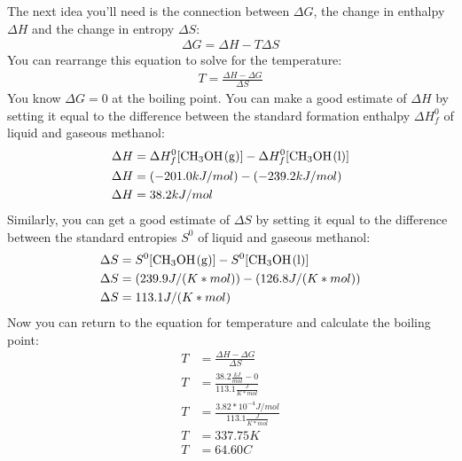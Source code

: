 \documentclass{article}  %
\begin{document}
The next idea you'll need is the connection between $\Delta G$, the change in enthalpy $\Delta H$ and the change in entropy $\Delta S$:
    \begin{equation*}
        \begin{aligned}
            \Delta G = \Delta H - T\Delta S 
        \end{aligned}
    \end{equation*}
You can rearrange this equation to solve for the temperature:
    \begin{equation*}
        \begin{aligned}
            T = \frac{\Delta H - \Delta G}{\Delta S}
        \end{aligned}
    \end{equation*}
You know $\Delta G = 0$ at the boiling point. You can make a good estimate of $\Delta H$ by setting it equal to the difference between the standard formation enthalpy $\Delta H^0_f$ of liquid and gaseous methanol:
\begin{equation*}
    \begin{aligned}
        \Delta H &= \Delta H^0_f [\ce{CH3OH_(g)}] - \Delta H^0_f[\ce{CH3OH_(l)}] \\
        \Delta H &= (-201.0 kJ/mol) - (-239.2 kJ/mol) \\
        \Delta H &= 38.2 kJ/mol
    \end{aligned}
\end{equation*}
Similarly, you can get a good estimate of $\Delta S$ by setting it equal to the difference between the standard entropies $S^0$ of liquid and gaseous methanol:
\begin{equation*}
    \begin{aligned}
        \Delta S &= S^0 [\ce{CH3OH_(g)}]-S^0[\ce{CH3OH_(l)}] \\
        \Delta S &= (239.9 J/(K*mol)) - (126.8 J/(K*mol)) \\
        \Delta S &= 113.1 J/(K*mol)
    \end{aligned}
\end{equation*}
Now you can return to the equation for temperature and calculate the boiling point: 
    \begin{equation*}
        \begin{aligned}
            T &= \frac{\Delta H - \Delta G}{\Delta S} \\
            T &= \frac{38.2 \frac{kJ}{mol} - 0}{113.1 \frac{J}{K*mol}} \\
            T &= \frac{3.82*10^{-4} J/mol}{113.1 \frac{J}{K*mol}} \\
            T &= 337.75K \\
            T &= 64.60C
        \end{aligned}
    \end{equation*}
\end{document}
